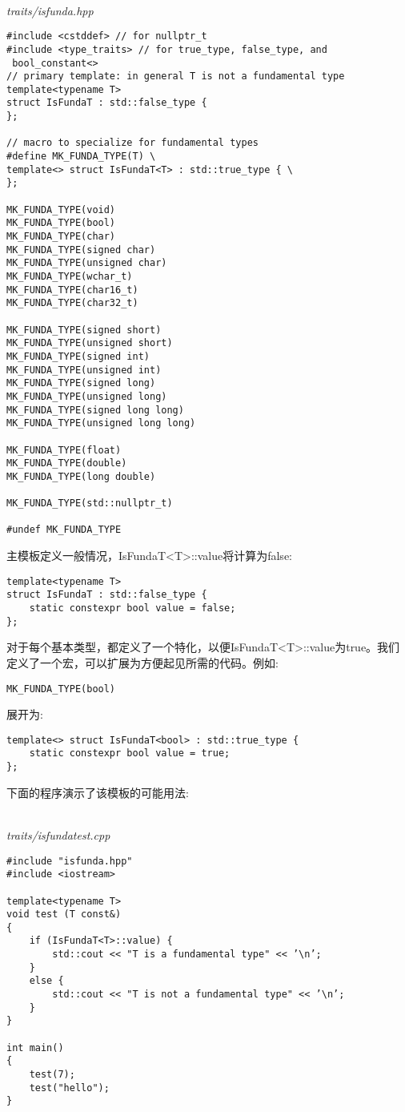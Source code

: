 \hspace*{\fill} \\ %
\noindent
\textit{traits/isfunda.hpp}
\begin{lstlisting}[style=styleCXX]
#include <cstddef> // for nullptr_t
#include <type_traits> // for true_type, false_type, and
 bool_constant<>
// primary template: in general T is not a fundamental type
template<typename T>
struct IsFundaT : std::false_type {
};

// macro to specialize for fundamental types
#define MK_FUNDA_TYPE(T) \
template<> struct IsFundaT<T> : std::true_type { \
};

MK_FUNDA_TYPE(void)
MK_FUNDA_TYPE(bool)
MK_FUNDA_TYPE(char)
MK_FUNDA_TYPE(signed char)
MK_FUNDA_TYPE(unsigned char)
MK_FUNDA_TYPE(wchar_t)
MK_FUNDA_TYPE(char16_t)
MK_FUNDA_TYPE(char32_t)

MK_FUNDA_TYPE(signed short)
MK_FUNDA_TYPE(unsigned short)
MK_FUNDA_TYPE(signed int)
MK_FUNDA_TYPE(unsigned int)
MK_FUNDA_TYPE(signed long)
MK_FUNDA_TYPE(unsigned long)
MK_FUNDA_TYPE(signed long long)
MK_FUNDA_TYPE(unsigned long long)

MK_FUNDA_TYPE(float)
MK_FUNDA_TYPE(double)
MK_FUNDA_TYPE(long double)

MK_FUNDA_TYPE(std::nullptr_t)

#undef MK_FUNDA_TYPE
\end{lstlisting}

主模板定义一般情况，IsFundaT<T>::value将计算为false:

\begin{lstlisting}[style=styleCXX]
template<typename T>
struct IsFundaT : std::false_type {
	static constexpr bool value = false;
};
\end{lstlisting}

对于每个基本类型，都定义了一个特化，以便IsFundaT<T>::value为true。我们定义了一个宏，可以扩展为方便起见所需的代码。例如:

\begin{lstlisting}[style=styleCXX]
MK_FUNDA_TYPE(bool)
\end{lstlisting}

展开为:

\begin{lstlisting}[style=styleCXX]
template<> struct IsFundaT<bool> : std::true_type {
	static constexpr bool value = true;
};
\end{lstlisting}

下面的程序演示了该模板的可能用法:

\hspace*{\fill} \\ %
\noindent
\textit{traits/isfundatest.cpp}
\begin{lstlisting}[style=styleCXX]
#include "isfunda.hpp"
#include <iostream>

template<typename T>
void test (T const&)
{
	if (IsFundaT<T>::value) {
		std::cout << "T is a fundamental type" << ’\n’;
	}
	else {
		std::cout << "T is not a fundamental type" << ’\n’;
	}
}

int main()
{
	test(7);
	test("hello");
}
\end{lstlisting}

